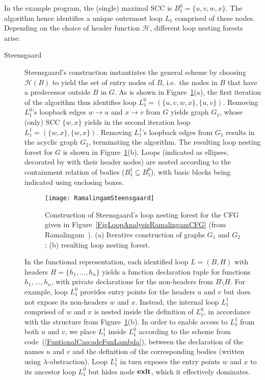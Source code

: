 In the example program, the (single) maximal SCC is $B^0_1 = \{u, v,
w, x\}$.  The algorithm hence identifies a unique outermost loop $L_1$
comprised of these nodes.  Depending on the choice of header function
$\mathcal{H}$, different loop nesting forests arise.

\begin{description}

\item[Steensgaard] Steensgaard's construction instantiates the general
  scheme by choosing $\mathcal{H}(B)$ to yield the set of entry nodes
  of $B$, i.e.~the nodes in $B$ that have a predecessor outside $B$ in
  $G$. As is shown in
  Figure~\ref{FigLoopAnalysisRamalingamSteensgaard}(a), the first
  iteration of the algorithm thus identifies loop $L^0_1=(\{u,v,w,x\},
  \{u,v\})$.  Removing $L^0_1$'s loopback edges $w \to u$ and $x \to
  v$ from $G$ yields graph $G_1$, whose (only) SCC $\{w,x\}$ yields in
  the second iteration loop $L^1_1 = (\{w,x\}, \{w,x\})$.  Removing
  $L^1_1$'s loopback edges from $G_1$ results in the acyclic graph
  $G_2$, terminating the algorithm.  The resulting loop nesting forest
  for $G$ is shown in
  Figure~\ref{FigLoopAnalysisRamalingamSteensgaard}(b).  Loops
  (indicated as ellipses, decorated by with their header nodes) are
  nested according to the containment relation of bodies ($B^1_1
  \subseteq B^0_1$), with basic blocks being indicated using enclosing
  boxes.

  \begin{figure}
    \begin{center}
    \texttt{[image: RamalingamSteensgaard]}
    \end{center}
    \caption{\label{FigLoopAnalysisRamalingamSteensgaard} Construction
       of Steensgaard's loop nesting forest for the CFG given in
       Figure~\ref{FigLoopAnalysisRamalingamCFG} (from
       Ramalingam~\cite{DBLP:journals/toplas/Ramalingam02}). 
       (a) Iterative construction of graphs $G_1$ and $G_2$; 
       (b) resulting loop nesting forest.}
  \end{figure} 

  In the functional representation, each identified loop $L=(B,H)$
  with headers $H=\{h_1,\ldots,h_n\}$ yields a function declaration
  tuple for functions $h_1,\ldots,h_n$, with private declarations for
  the non-headers from $B \setminus H$. For example, loop $L^0_1$
  provides entry points for the headers $u$ and $v$ but does not
  expose its non-headers $w$ and $x$.  Instead, the internal loop
  $L^1_1$ comprised of $w$ and $x$ is nested inside the definition of
  $L^0_1$, in accordance with the structure from
  Figure~\ref{FigLoopAnalysisRamalingamSteensgaard}(b).  In order to
  enable access to $L^1_1$ from both $u$ and $v$, we place $L^1_1$
  inside $L^0_1$ according to the scheme from
  code~(\ref{FuntionalCascadeFunLambda}), between the declaration of
  the names $u$ and $v$ and the definition of the corresponding bodies
  (written using $\lambda$-abstraction). Loop $L^1_1$ in turn exposes
  the entry points $w$ and $x$ to its ancestor loop $L^0_1$ but hides
  node $\mathbf{exit}$, which it effectively dominates.  


\end{description}
